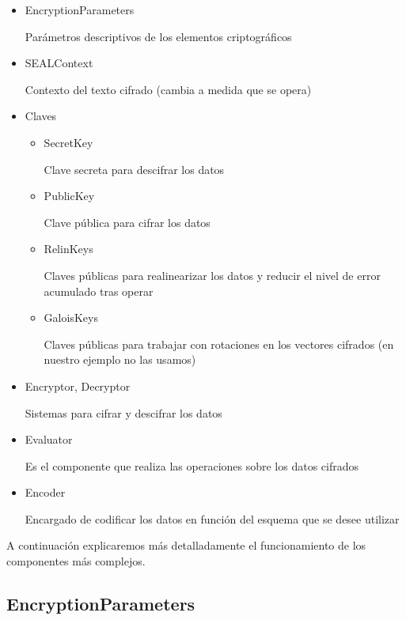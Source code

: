 \begin{itemize}

  \item EncryptionParameters
  
  Parámetros descriptivos de los elementos criptográficos

  \item SEALContext

  Contexto del texto cifrado (cambia a medida que se opera)

  \item Claves

  \begin{itemize}

    \item SecretKey

    Clave secreta para descifrar los datos

    \item PublicKey

    Clave pública para cifrar los datos

    \item RelinKeys

    Claves públicas para realinearizar los datos y reducir el nivel de error acumulado tras operar

    \item GaloisKeys

    Claves públicas para trabajar con rotaciones en los vectores cifrados (en nuestro ejemplo no las usamos)

  \end{itemize}

  \item Encryptor, Decryptor

  Sistemas para cifrar y descifrar los datos

  \item Evaluator

  Es el componente que realiza las operaciones sobre los datos cifrados

  \item Encoder

  Encargado de codificar los datos en función del esquema que se desee utilizar

\end{itemize}

A continuación explicaremos más detalladamente el funcionamiento de los componentes más complejos.

\subsection{EncryptionParameters}

